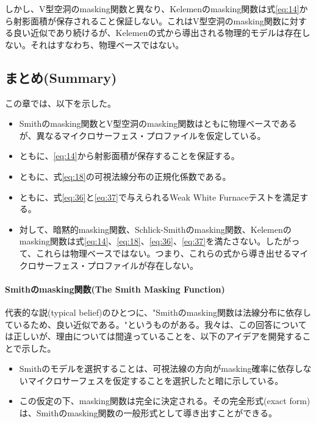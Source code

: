 \documentclass[a4j,xelatex,ja=standard]{bxjsarticle}
\begin{document}
しかし、V型空洞のmasking関数と異なり、Kelemenのmasking関数は式\eqref{eq:14}から射影面積が保存されること保証しない。これはV型空洞のmasking関数に対する良い近似であり続けるが、Kelemenの式から導出される物理的モデルは存在しない。それはすなわち、物理ベースではない。

\subsection{まとめ(Summary)}

この章では、以下を示した。

\begin{itemize}
    \item Smithのmasking関数とV型空洞のmasking関数はともに物理ベースであるが、異なるマイクロサーフェス・プロファイルを仮定している。
    \item ともに、\eqref{eq:14}から射影面積が保存することを保証する。
    \item ともに、式\eqref{eq:18}の可視法線分布の正規化係数である。
    \item ともに、式\eqref{eq:36}と\eqref{eq:37}で与えられるWeak White Furnaceテストを満足する。
    \item 対して、暗黙的masking関数、Schlick-Smithのmasking関数、Kelemenのmasking関数は式\eqref{eq:14}、\eqref{eq:18}、\eqref{eq:36}、\eqref{eq:37}を満たさない。したがって、これらは物理ベースではない。つまり、これらの式から導き出せるマイクロサーフェス・プロファイルが存在しない。
\end{itemize}

\paragraph{Smithのmasking関数(The Smith Masking Function)}

代表的な説(typical belief)のひとつに、"Smithのmasking関数は法線分布に依存しているため、良い近似である。"というものがある。我々は、この回答については正しいが、理由については間違っていることを、以下のアイデアを開発することで示した。

\begin{itemize}
    \item Smithのモデルを選択することは、可視法線の方向がmasking確率に依存しないマイクロサーフェスを仮定することを選択したと暗に示している。
    \item この仮定の下、masking関数は完全に決定される。その完全形式(exact form)は、Smithのmasking関数の一般形式として導き出すことができる。
\end{itemize}
\end{document}
